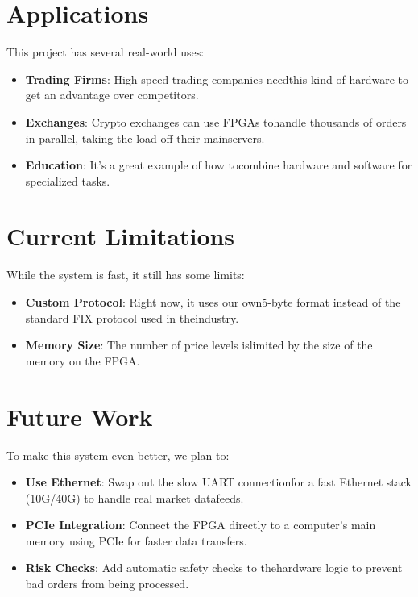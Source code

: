 \documentclass[conference,a4paper]{IEEEtran}
\begin{document}
\section{Applications}
This ​project ​has ​several ​real-world ​uses:
\begin{itemize}
    \item \textbf{Trading ​Firms}: ​High-speed ​trading ​companies ​need ​this ​kind ​of ​hardware ​to ​get ​an ​advantage ​over ​competitors.
    \item \textbf{Exchanges}: ​Crypto ​exchanges ​can ​use ​FPGAs ​to ​handle ​thousands ​of ​orders ​in ​parallel, ​taking ​the ​load ​off ​their ​main ​servers.
    \item \textbf{Education}: ​It's ​a great ​example ​of ​how ​to ​combine ​hardware ​and ​software ​for ​specialized ​tasks.
\end{itemize}

\section{Current ​Limitations}
While ​the ​system ​is ​fast, ​it ​still ​has ​some ​limits:
\begin{itemize}
    \item \textbf{Custom ​Protocol}: ​Right ​now, ​it ​uses ​our ​own ​5-byte ​format ​instead ​of ​the ​standard ​FIX ​protocol ​used ​in ​the ​industry.
    \item \textbf{Memory ​Size}: ​The ​number ​of ​price ​levels ​is ​limited ​by ​the ​size ​of ​the ​memory ​on ​the ​FPGA.
\end{itemize}

\section{Future ​Work}
To ​make ​this ​system ​even ​better, ​we ​plan ​to:
\begin{itemize}
    \item \textbf{Use ​Ethernet}: ​Swap ​out ​the ​slow ​UART ​connection ​for ​a fast ​Ethernet ​stack (10G/40G) to ​handle ​real ​market ​data ​feeds.
    \item \textbf{PCIe ​Integration}: ​Connect ​the ​FPGA ​directly ​to ​a computer's ​main ​memory ​using ​PCIe ​for ​faster ​data ​transfers.
    \item \textbf{Risk ​Checks}: ​Add ​automatic ​safety ​checks ​to ​the ​hardware ​logic ​to ​prevent ​bad ​orders ​from ​being ​processed.
\end{itemize}
\end{document}
